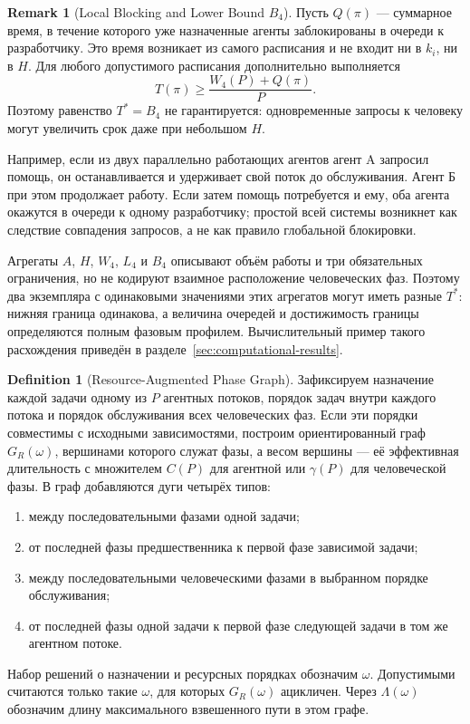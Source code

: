 \documentclass[12pt,a4paper]{article}
\theoremstyle{definition}
\newtheorem{definition}{Definition}
\newtheorem{remark}{Remark}
\begin{document}
\begin{remark}[Local Blocking and Lower Bound $B_4$]
Пусть $Q(\pi)$ --- суммарное время, в течение которого уже назначенные агенты заблокированы в очереди к разработчику. Это время возникает из самого расписания и не входит ни в $k_i$, ни в $H$. Для любого допустимого расписания дополнительно выполняется
\[
  T(\pi)\ge \frac{W_4(P)+Q(\pi)}{P}.
\]
Поэтому равенство $T^{*}=B_4$ не гарантируется: одновременные запросы к человеку могут увеличить срок даже при небольшом $H$.

Например, если из двух параллельно работающих агентов агент A запросил помощь, он останавливается и удерживает свой поток до обслуживания. Агент Б при этом продолжает работу. Если затем помощь потребуется и ему, оба агента окажутся в очереди к одному разработчику; простой всей системы возникнет как следствие совпадения запросов, а не как правило глобальной блокировки.

Агрегаты $A$, $H$, $W_4$, $L_4$ и $B_4$ описывают объём работы и три обязательных ограничения, но не кодируют взаимное расположение человеческих фаз. Поэтому два экземпляра с одинаковыми значениями этих агрегатов могут иметь разные $T^{*}$: нижняя граница одинакова, а величина очередей и достижимость границы определяются полным фазовым профилем. Вычислительный пример такого расхождения приведён в разделе~\ref{sec:computational-results}.
\end{remark}

\begin{definition}[Resource-Augmented Phase Graph]\label{def:resource-graph}
Зафиксируем назначение каждой задачи одному из $P$ агентных потоков, порядок задач внутри каждого потока и порядок обслуживания всех человеческих фаз. Если эти порядки совместимы с исходными зависимостями, построим ориентированный граф $G_R(\omega)$, вершинами которого служат фазы, а весом вершины --- её эффективная длительность с множителем $C(P)$ для агентной или $\gamma(P)$ для человеческой фазы. В граф добавляются дуги четырёх типов:
\begin{enumerate}
  \item между последовательными фазами одной задачи;
  \item от последней фазы предшественника к первой фазе зависимой задачи;
  \item между последовательными человеческими фазами в выбранном порядке обслуживания;
  \item от последней фазы одной задачи к первой фазе следующей задачи в том же агентном потоке.
\end{enumerate}
Набор решений о назначении и ресурсных порядках обозначим $\omega$. Допустимыми считаются только такие $\omega$, для которых $G_R(\omega)$ ацикличен. Через $\Lambda(\omega)$ обозначим длину максимального взвешенного пути в этом графе.
\end{definition}
\end{document}
